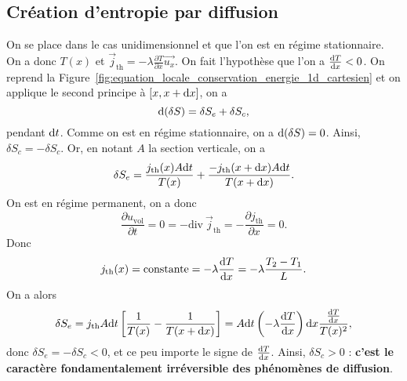     \subsection{Création d'entropie par diffusion}
            
        On se place dans le cas unidimensionnel et que l'on est en régime stationnaire. On a donc $T(x)$ et $\vec{j}_{\text{th}}=-\lambda\frac{\partial T}{\partial x}\vec{u_x}$. On fait l'hypothèse que l'on a $\frac{\mathrm{d} T}{\mathrm{d} x}<0$. On reprend la Figure~\ref{fig:equation_locale_conservation_energie_1d_cartesien} et on applique le second principe à $[x,x+\mathrm{d} x]$, on a 
        \begin{equation*}
            \mathrm{d}(\delta S)=\delta S_e+\delta S_c,
        \end{equation*}
        pendant $\mathrm{d} t$. Comme on est en régime stationnaire, on a $\mathrm{d}(\delta S)=0$. Ainsi, $\delta S_c=-\delta S_c$. Or, en notant $A$ la section verticale, on a
        \begin{equation*}
            \delta S_e=\frac{j_{\text{th}}(x) A\mathrm{d} t}{T(x)}+\frac{-j_{\text{th}}(x+\mathrm{d} x)A\mathrm{d} t}{T(x+\mathrm{d} x)}.
        \end{equation*}
        On est en régime permanent, on a donc
        \begin{equation*}
            \frac{\partial u_{\text{vol}}}{\partial t}=0=-\mathrm{div}~\vec{j}_{\text{th}}=-\frac{\partial j_{\text{th}}}{\partial x}=0.
        \end{equation*}
        Donc 
        \begin{equation*}
            j_{\text{th}}(x)=\mathrm{constante}=-\lambda\frac{\mathrm{d} T}{\mathrm{d} x}=-\lambda\frac{T_2-T_1}{L}.
        \end{equation*}
        On a alors
        \begin{equation*}
            \delta S_e
            =j_{\text{th}}A\mathrm{d} t\left[
                \frac{1}{T(x)}-\frac{1}{T(x+\mathrm{d} x)}
            \right]=A\mathrm{d} t\left(-\lambda\frac{\mathrm{d} T}{\mathrm{d} x}\right)\mathrm{d} x\frac{\frac{\mathrm{d} T}{\mathrm{d} x}}{T(x)^{2}},
        \end{equation*}
        donc $\delta S_e=-\delta S_c<0$, et ce peu importe le signe de $\frac{\mathrm{d} T}{\mathrm{d} x}$. Ainsi, $\delta S_c>0$ : \textbf{c'est le caractère fondamentalement irréversible des phénomènes de diffusion}.